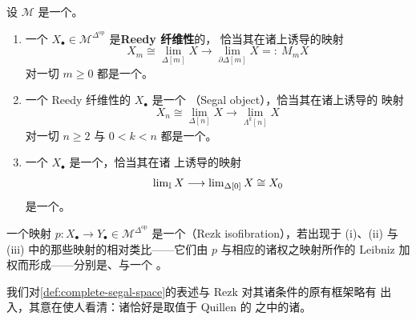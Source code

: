 \begin{definition}\label{def:rezk-objects}
设 $\mathcal{M}$ 是一个\trModelCategory。
\begin{enumerate}[label=(\roman*)]
\item 一个\trSimplicialObject{}
  $X_{\bullet}\in\mathcal{M}^{\Delta^{\mathrm{op}}}$ 是\textbf{Reedy 纤维性}的，
  恰当其在诸\trWeightedLimit{}上诱导的映射
  \[
  X_{m}\cong\operatorname{lim}_{\Delta[m]}X\longrightarrow
  \operatorname{lim}_{\partial\Delta[m]}X=:\ M_{m}X
  \]
  对一切 $m\ge 0$ 都是一个\trFibration。
\item 一个 Reedy 纤维性的\trSimplicialObject{} $X_{\bullet}$ 是一个%
  \textbf{\trSegalObject}（Segal object），恰当其在诸\trWeightedLimit{}上诱导的
  映射
  \[
  X_{n}\cong\operatorname{lim}_{\Delta[n]}X\longrightarrow
  \operatorname{lim}_{\Lambda^{k}[n]}X
  \]
  对一切 $n\ge 2$ 与 $0<k<n$ 都是一个\trTrivialFibration。
\item 一个\trSegalObject{} $X_{\bullet}$ 是一个\textbf{\trRezkObject}，恰当其在诸%
  \trWeightedLimit{}上诱导的映射
  \[
  \operatorname{lim}_{\mathbb{I}}X\longrightarrow
  \operatorname{lim}_{\Delta[0]}X\cong X_{0}
  \]
  是一个\trTrivialFibration。
\end{enumerate}
\end{definition}

一个映射 $p\colon X_{\bullet}\to Y_{\bullet}\in\mathcal{M}^{\Delta^{\mathrm{op}}}$
是一个\textbf{\trRezkIsofibration}（Rezk isofibration），若出现于 (i)、(ii) 与
(iii) 中的那些映射的相对类比——它们由 $p$ 与相应的诸权之映射所作的 Leibniz
加权\trWeightedLimit{}而形成——分别是\trFibration、\trTrivialFibration{}与一个%
\trTrivialFibration。

我们对\cref{def:complete-segal-space}的表述与 Rezk 对其诸条件的原有框架略有
出入，其意在使人看清：诸\trCompleteSegalSpaces{}恰好是取值于 Quillen 的%
\trKanComplex{}之\trModelStructure{}中的诸\trRezkObject。

